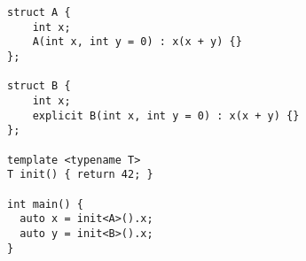 \begin{lstlisting}[title=\href{https://godbolt.org/z/vYab6f}{\texttt{godbolt.org/z/vYab6f}}]
struct A {
    int x;
    A(int x, int y = 0) : x(x + y) {}
};

struct B {
    int x;
    explicit B(int x, int y = 0) : x(x + y) {}
};

template <typename T>
T init() { return 42; }

int main() {
  auto x = init<A>().x;
  auto y = init<B>().x; 
}
\end{lstlisting}
